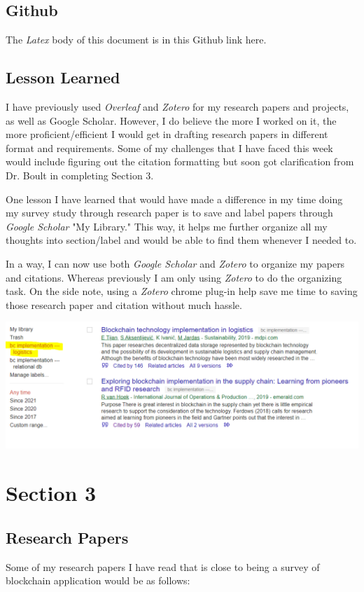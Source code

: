 \documentclass[11pt]{article}
\begin{document}
\subsection{Github} 
The \emph{Latex} body of this document is in this Github link here.

\subsection{Lesson Learned}
I have previously used \emph{Overleaf} and \emph{Zotero} for my research papers and projects, as well as Google Scholar. However, I do believe the more I worked on it, the more proficient/efficient I would get in drafting research papers in different format and requirements. Some of my challenges that I have faced this week would include figuring out the citation formatting but soon got clarification from Dr. Boult in completing Section 3.

One lesson I have learned that would have made a difference in my time doing my survey study through research paper is to save and label papers through \emph{Google Scholar} "My Library." This way, it helps me further organize all my thoughts into section/label and would be able to find them whenever I needed to.

In a way, I can now use both \emph{Google Scholar} and \emph{Zotero} to organize my papers and citations. Whereas previously I am only using \emph{Zotero} to do the organizing task. On the side note, using a \emph{Zotero} chrome plug-in help save me time to saving those research paper and citation without much hassle.

\begin{center}
\includegraphics[scale=0.65]{research6.png}
\end{center}

\section{Section 3}

\subsection{Research Papers}
Some of my research papers I have read that is close to being a survey of blockchain application would be as follows: 
\end{document}
